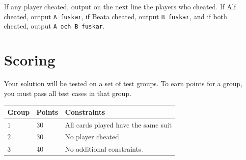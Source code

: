 If any player cheated, output on the next line the players who cheated.
If Alf cheated, output \texttt{A fuskar},
if Beata cheated, output \texttt{B fuskar},
and if both cheated, output \texttt{A och B fuskar}.

\section*{Scoring}
Your solution will be tested on a set of test groups. To earn points for a group, you must pass all test cases in that group.

\noindent
\begin{tabular}{| l | l | p{12cm} |}
  \hline
  \textbf{Group} & \textbf{Points} & \textbf{Constraints} \\ \hline
  $1$    & $30$      & All cards played have the same suit \\ \hline
  $2$    & $30$      & No player cheated \\ \hline
  $3$    & $40$      & No additional constraints.  \\ \hline
\end{tabular}
